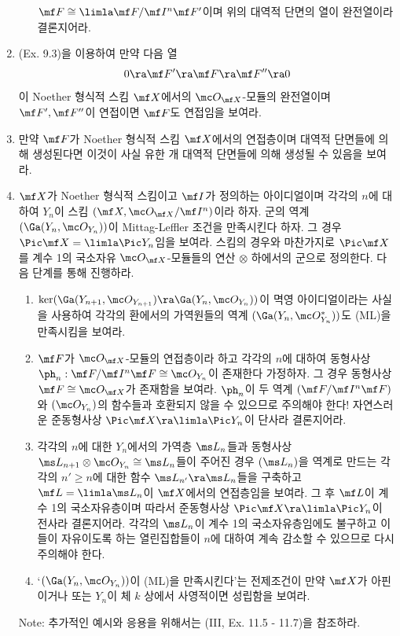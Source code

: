 \begin{enumerate}[label=\tb{9.\arabic*.},itemindent=0mm,itemsep=2mm]
\begin{enumerate}[label=(\alph*)]
	$\mf F\cong\limla\mf F/\mf I^n\mf F'$이며 위의 대역적 단면의 열이 완전열이라 결론지어라.
	\end{enumerate}
	\item (Ex. 9.3)을 이용하여 만약 다음 열
	$$0\ra\mf F'\ra\mf F\ra\mf F''\ra 0$$
	이 Noether 형식적 스킴 $\mf X$에서의 $\mc O_{\mf X}$-모듈의 완전열이며 $\mf F',\mf F''$이 연접이면 $\mf F$도 연접임을 보여라.
	\item 만약 $\mf F$가 Noether 형식적 스킴 $\mf X$에서의 연접층이며 대역적 단면들에 의해 생성된다면
	이것이 사실 유한 개 대역적 단면들에 의해 생성될 수 있음을 보여라.
	\item $\mf X$가 Noether 형식적 스킴이고 $\mf I$가 정의하는 아이디얼이며
	각각의 $n$에 대하여 $Y_n$이 스킴 $(\mf X,\mc O_{\mf X}/\mf I^n)$이라 하자.
	군의 역계 $(\Ga(Y_n,\mc O_{Y_n}))$이 Mittag-Leffler 조건을 만족시킨다 하자. 그 경우 $\Pic\mf X=\limla\Pic Y_n$임을 보여라.
	스킴의 경우와 마찬가지로 $\Pic\mf X$를 계수 1의 국소자유 $\mc O_{\mf X}$-모듈들의 연산 $\otimes$ 하에서의 군으로 정의한다.
	다음 단계를 통해 진행하라.
	\begin{enumerate}[label=(\alph*)]
	\item $\ker(\Ga(Y_{n+1},\mc O_{Y_{n+1}})\ra\Ga(Y_n,\mc O_{Y_n}))$이 멱영 아이디얼이라는 사실을 사용하여
	각각의 환에서의 가역원들의 역계 $(\Ga(Y_n,\mc O_{Y_n}^*))$도 (ML)을 만족시킴을 보여라.
	\item $\mf F$가 $\mc O_{\mf X}$-모듈의 연접층이라 하고 각각의 $n$에 대하여
	동형사상 $\ph_n:\mf F/\mf I^n\mf F\cong\mc O_{Y_n}$이 존재한다 가정하자.
	그 경우 동형사상 $\mf F\cong\mc O_{\mf X}$가 존재함을 보여라.
	$\ph_n$이 두 역계 $(\mf F/\mf I^n\mf F)$와 $(\mc O_{Y_n})$의 함수들과 호환되지 않을 수 있으므로 주의해야 한다!
	자연스러운 준동형사상 $\Pic\mf X\ra\limla\Pic Y_n$이 단사라 결론지어라.
	\item 각각의 $n$에 대한 $Y_n$에서의 가역층 $\ms L_n$들과 동형사상 $\ms L_{n+1}\otimes\mc O_{Y_n}\cong\ms L_n$들이 주어진 경우
	$(\ms L_n)$을 역계로 만드는 각각의 $n'\ge n$에 대한 함수 $\ms L_{n'}\ra\ms L_n$들을 구축하고
	$\mf L=\limla\ms L_n$이 $\mf X$에서의 연접층임을 보여라.
	그 후 $\mf L$이 계수 1의 국소자유층이며 따라서 준동형사상 $\Pic\mf X\ra\limla\Pic Y_n$이 전사라 결론지어라.
	각각의 $\ms L_n$이 계수 1의 국소자유층임에도 불구하고 이들이 자유이도록 하는 열린집합들이
	$n$에 대하여 계속 감소할 수 있으므로 다시 주의해야 한다.
	\item `$(\Ga(Y_n,\mc O_{Y_n}))$이 (ML)을 만족시킨다'는 전제조건이
	만약 $\mf X$가 아핀이거나 또는 $Y_n$이 체 $k$ 상에서 사영적이면 성립함을 보여라.
	\end{enumerate}
	Note: 추가적인 예시와 응용을 위해서는 (III, Ex. 11.5 - 11.7)을 참조하라.
	\end{enumerate}
	
	
	